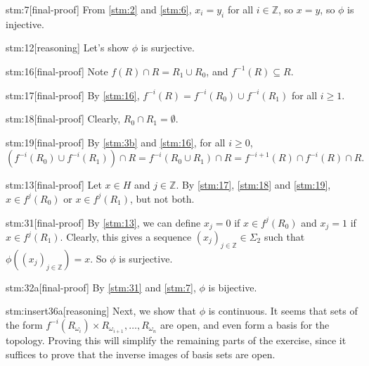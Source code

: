 \documentclass{article}
\begin{document}
\begin{stm}{stm:7}[final-proof]
From \ref{stm:2} and \ref{stm:6}, $x_i = y_i$ for all $i \in \mathbb{Z}$, so $x = y$, so $\phi$ is injective.
\end{stm}

\begin{stm}{stm:12}[reasoning]
Let's show $\phi$ is surjective.
\end{stm}

\begin{stm}{stm:16}[final-proof]
Note $f(R) \cap R = R_1 \cup R_0$, and $f^{-1}(R) \subseteq R$.
\end{stm}

\begin{stm}{stm:17}[final-proof]
By \ref{stm:16}, $f^{-i}(R) = f^{-i}(R_0) \cup f^{-i}(R_1)$ for all $i \geq 1$.
\end{stm}

\begin{stm}{stm:18}[final-proof]
Clearly, $R_0 \cap R_1 = \emptyset$.
\end{stm}

\begin{stm}{stm:19}[final-proof]
By \ref{stm:3b} and \ref{stm:16}, for all $i \ge 0$,
\[
\left(f^{-i}(R_0) \cup f^{-i}(R_1)\right) \cap R = f^{-i}(R_0 \cup R_1) \cap R = f^{-i+1}(R) \cap f^{-i}(R) \cap R.
\]
\end{stm}

\begin{stm}{stm:13}[final-proof]
Let $x \in H$ and $j \in \mathbb{Z}$. By \ref{stm:17}, \ref{stm:18} and \ref{stm:19}, $x \in f^j(R_0)$ or $x \in f^j(R_1)$, but not both.
\end{stm}

\begin{stm}{stm:31}[final-proof]
By \ref{stm:13}, we can define $x_j = 0$ if $x \in f^j(R_0)$ and $x_j = 1$ if $x \in f^j(R_1)$.  Clearly, this gives a sequence $(x_j)_{j \in \mathbb{Z}} \in \Sigma_2$ such that $\phi((x_j)_{j \in \mathbb{Z}}) = x$.
So $\phi$ is surjective.
\end{stm}

\begin{stm}{stm:32a}[final-proof]
By \ref{stm:31} and \ref{stm:7}, $\phi$ is bijective.
\end{stm}

\begin{stm}{stm:insert36a}[reasoning]
Next, we show that $\phi$ is continuous. It seems that sets of the form $f^{-i}(R_{\omega_i}) \times R_{\omega_{i+1}}, \ldots, R_{\omega_n}$ are open, and even form a basis for the topology. Proving this will simplify the remaining parts of the exercise, since it suffices to prove that the inverse images of basis sets are open.
\end{stm}
\end{document}

